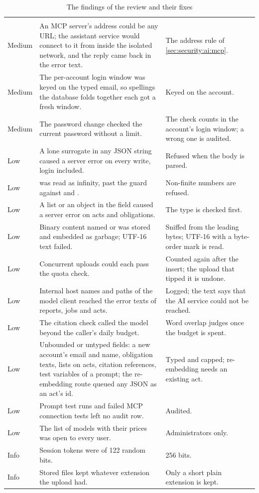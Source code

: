 \begin{xltabular}{\textwidth}{@{}L{15mm}YL{50mm}@{}}
\caption{The findings of the review and their fixes}\label{tab:security:findings}\\
\toprule
{} &  &  \\
\midrule
\endfirsthead
\toprule
{} &  &  \\
\midrule
\endhead
\bottomrule
\endlastfoot
Medium & An MCP server's address could be any URL; the assistant service would connect to it from inside the isolated network, and the reply came back in the error text. & The address rule of \cref{sec:security:ai:mcp}. \\
Medium & The per-account login window was keyed on the typed email, so spellings the database folds together each got a fresh window. & Keyed on the account. \\
Medium & The password change checked the current password without a limit. & The check counts in the account's login window; a wrong one is audited. \\
Low & A lone surrogate in any JSON string caused a server error on every write, login included. & Refused when the body is parsed. \\
Low &  was read as infinity, past the guard against  and . & Non-finite numbers are refused. \\
Low & A list or an object in the field  caused a server error on acts and obligations. & The type is checked first. \\
Low & Binary content named  or  was stored and embedded as garbage; UTF-16 text failed. & Sniffed from the leading bytes; UTF-16 with a byte-order mark is read. \\
Low & Concurrent uploads could each pass the quota check. & Counted again after the insert; the upload that tipped it is undone. \\
Low & Internal host names and paths of the model client reached the error texts of reports, jobs and acts. & Logged; the text says that the AI service could not be reached. \\
Low & The citation check called the model beyond the caller's daily budget. & Word overlap judges once the budget is spent. \\
Low & Unbounded or untyped fields: a new account's email and name, obligation texts, lists on acts, citation references, test variables of a prompt; the re-embedding route queued any JSON as an act's id. & Typed and capped; re-embedding needs an existing act. \\
Low & Prompt test runs and failed MCP connection tests left no audit row. & Audited. \\
Low & The list of models with their prices was open to every user. & Administrators only. \\
Info & Session tokens were of 122 random bits. & 256 bits. \\
Info & Stored files kept whatever extension the upload had. & Only a short plain extension is kept. \\
\end{xltabular}


